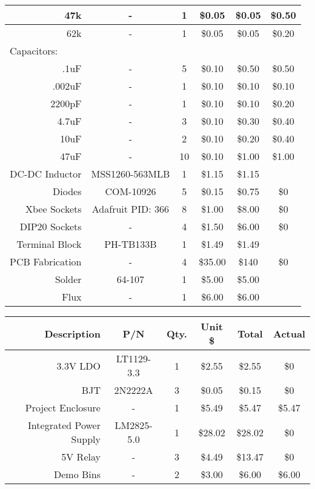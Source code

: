 \begin{center}
\begin{tabular}{|r|c|c|c|c|c|}
\hline
{47k} & - & 1 & \$0.05 & \$0.05 & \$0.50\\
\hline
{62k} & - & 1 & \$0.05 & \$0.05 & \$0.20\\
\hline
\multicolumn{1}{|l|}{Capacitors:} &   &   &   &  &\\
\hline
{.1uF} & - & 5 & \$0.10 & \$0.50 & \$0.50\\
\hline
{.002uF} & - & 1 & \$0.10 & \$0.10 & \$0.10\\
\hline
{2200pF} & - & 1 & \$0.10 & \$0.10 & \$0.20\\
\hline
{4.7uF} & - & 3 & \$0.10 & \$0.30 & \$0.40\\
\hline
{10uF} & - & 2 & \$0.10 & \$0.20 & \$0.40\\
\hline
{47uF} & - & 10 & \$0.10 & \$1.00 & \$1.00\\
\hline
DC-DC Inductor & MSS1260-563MLB & 1 & \$1.15 & \$1.15 &\\
\hline
{Diodes} & COM-10926 & 5 & \$0.15 & \$0.75 & \$0\\
\hline
{Xbee Sockets} & Adafruit PID: 366 & 8 & \$1.00 & \$8.00 & \$0\\
\hline
{DIP20 Sockets} & - & 4 & \$1.50 & \$6.00 & \$0\\
\hline
{Terminal Block} & PH-TB133B & 1 & \$1.49 & \$1.49 &\\
\hline
{PCB Fabrication} & - & 4 & \$35.00 & \$140 & \$0\\
\hline
{Solder} & 64-107 & 1 & \$5.00 & \$5.00 &\\
\hline
{Flux} & - & 1 & \$6.00 & \$6.00 &\\
\hline
\end{tabular}%

\begin{tabular}{|r|c|c|c|c|c|}
\hline
{Description} & {P/N} & {Qty.} & {Unit \$} & {Total} & {Actual}\\
\hline
\hline
{3.3V LDO} & LT1129-3.3 & 1 & \$2.55 & \$2.55 & \$0\\
\hline
{BJT} & 2N2222A & 3 & \$0.05 & \$0.15 & \$0\\
\hline
{Project Enclosure} & - & 1 & \$5.49 & \$5.47 & \$5.47\\
\hline
{Integrated Power Supply} & LM2825-5.0 & 1 & \$28.02 & \$28.02 & \$0\\
\hline
{5V Relay} & - & 3 & \$4.49 & \$13.47 & \$0\\
\hline
Demo Bins & - & 2 & \$3.00 & \$6.00 & \$6.00\\
\hline
\end{tabular}
\end{center}



